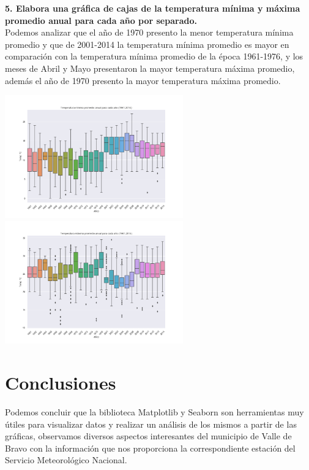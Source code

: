 \documentclass[12pt]{article}
\begin{document}
\noindent\textbf {5. Elabora una gráfica de cajas de la temperatura mínima y máxima promedio anual para cada año por separado.} \\
Podemos analizar que el año de 1970 presento la menor temperatura mínima promedio y que de 2001-2014 la temperatura mínima promedio es mayor en comparación con la temperatura mínima promedio de la época 1961-1976, y los meses de Abril y Mayo presentaron la mayor temperatura máxima promedio, además el año de 1970 presento la mayor temperatura máxima promedio.
\begin{center}
\includegraphics[height=5.3cm]{Temp_promanumin.png}
\hspace*{\fill}
\includegraphics[height=5.3cm]{Temp_promanumax.png}
\end{center}


\section{Conclusiones}
Podemos concluir que la biblioteca Matplotlib y Seaborn son herramientas muy útiles para visualizar datos y realizar un análisis de los mismos a partir de las gráficas, observamos diversos aspectos interesantes del municipio de Valle de Bravo con la información que nos proporciona la correspondiente estación del Servicio Meteorológico Nacional.
\end{document}
